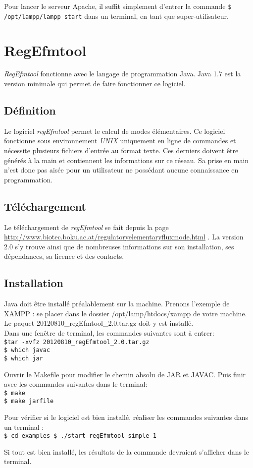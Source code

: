 \documentclass[12pt,a4paper]{article}
\begin{document}
Pour lancer le serveur Apache, il suffit simplement d'entrer la commande \texttt{\$ /opt/lampp/lampp start} dans un terminal, en tant que super-utilisateur.

\section{RegEfmtool}

\textit{RegEfmtool} fonctionne avec le langage de programmation Java. Java 1.7 est la version minimale qui permet de faire fonctionner ce logiciel.

\subsection{Définition}

Le logiciel \textit{regEfmtool} permet le calcul de modes élémentaires. Ce logiciel fonctionne sous environnement \emph{UNIX} uniquement en ligne de commandes et nécessite plusieurs fichiers d'entrée au format texte. Ces derniers doivent être générés à la main et contiennent les informations sur ce réseau. Sa prise en main n'est donc pas aisée pour un utilisateur ne possédant aucune connaissance en programmation.

\subsection{Téléchargement}

Le téléchargement de \textit{regEfmtool} se fait depuis la page \url{http://www.biotec.boku.ac.at/regulatoryelementaryfluxmode.html} . La version 2.0 s'y trouve ainsi que de nombreuses informations sur son installation, ses dépendances, sa licence et des contacts.

\subsection{Installation}

Java doit être installé préalablement sur la machine. Prenons l'exemple de XAMPP : se placer dans le dossier /opt/lamp/htdocs/xampp de votre machine. Le paquet 20120810\_regEfmtool\_2.0.tar.gz doit y est installé. \\
Dans une fenêtre de terminal, les commandes suivantes sont à entrer:\\
\texttt{\$tar -xvfz 20120810\_regEfmtool\_2.0.tar.gz\\
\$ which javac\\
\$ which jar\\}

Ouvrir le Makefile pour modifier le chemin absolu de JAR et JAVAC. Puis finir avec les commandes suivantes dans le terminal:\\
\texttt{\$ make\\
\$ make jarfile\\}

Pour vérifier si le logiciel est bien installé, réaliser les commandes suivantes dans un terminal :\\
\texttt{\$ cd examples
\$ ./start\_regEfmtool\_simple\_1}

Si tout est bien installé, les résultats de la commande devraient s'afficher dans le terminal.
\end{document}
